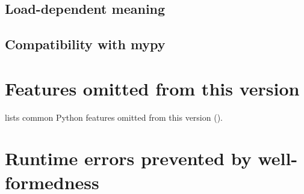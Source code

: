 \subsection{Load-dependent meaning}
\label{sec:no-load-dependent}



\subsection{Compatibility with mypy}
\label{sec:mypy-restrictions}



\section{Features omitted from this version}
\label{sec:excluded-from-version}

 lists common Python features omitted from this version ().



\section{Runtime errors prevented by well-formedness}
\label{sec:runtime-errors}


